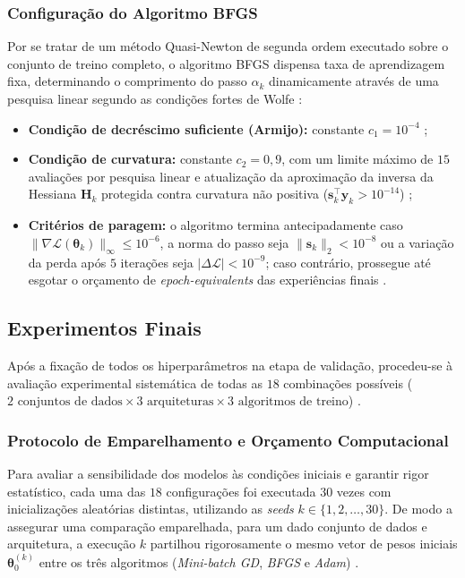 \documentclass[conference]{IEEEtran}
\begin{document}
\subsubsection{Configuração do Algoritmo BFGS}
Por se tratar de um método Quasi-Newton de segunda ordem executado sobre o conjunto de treino completo, o algoritmo BFGS dispensa taxa de aprendizagem fixa, determinando o comprimento do passo $\alpha_k$ dinamicamente através de uma pesquisa linear segundo as condições fortes de Wolfe \cite{b9}:
\begin{itemize}
    \item \textbf{Condição de decréscimo suficiente (Armijo):} constante $c_1 = 10^{-4}$ \cite{b9};
    \item \textbf{Condição de curvatura:} constante $c_2 = 0{,}9$, com um limite máximo de $15$ avaliações por pesquisa linear e atualização da aproximação da inversa da Hessiana $\mathbf{H}_k$ protegida contra curvatura não positiva ($\mathbf{s}_k^\top \mathbf{y}_k > 10^{-14}$) \cite{b9};
    \item \textbf{Critérios de paragem:} o algoritmo termina antecipadamente caso $\|\nabla \mathcal{L}(\boldsymbol{\theta}_k)\|_\infty \le 10^{-6}$, a norma do passo seja $\|\mathbf{s}_k\|_2 < 10^{-8}$ ou a variação da perda após $5$ iterações seja $|\Delta \mathcal{L}| < 10^{-9}$; caso contrário, prossegue até esgotar o orçamento de \textit{epoch-equivalents} das experiências finais \cite{b1, b9}.
\end{itemize}

\subsection{Experimentos Finais}

Após a fixação de todos os hiperparâmetros na etapa de validação, procedeu-se à avaliação experimental sistemática de todas as $18$ combinações possíveis ($2\text{ conjuntos de dados} \times 3\text{ arquiteturas} \times 3\text{ algoritmos de treino}$) \cite{b1}.

\subsubsection{Protocolo de Emparelhamento e Orçamento Computacional}
Para avaliar a sensibilidade dos modelos às condições iniciais e garantir rigor estatístico, cada uma das $18$ configurações foi executada $30$ vezes com inicializações aleatórias distintas, utilizando as \textit{seeds} $k \in \{1, 2, \dots, 30\}$. De modo a assegurar uma comparação emparelhada, para um dado conjunto de dados e arquitetura, a execução $k$ partilhou rigorosamente o mesmo vetor de pesos iniciais $\boldsymbol{\theta}_0^{(k)}$ entre os três algoritmos (\textit{Mini-batch GD}, \textit{BFGS} e \textit{Adam}) \cite{b1}.
\end{document}
